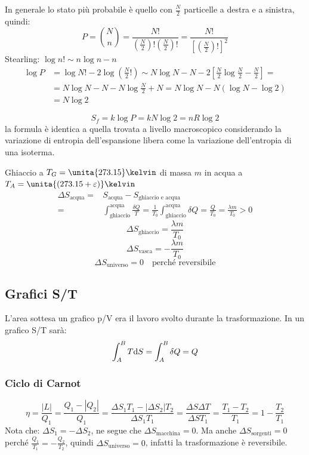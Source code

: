 In generale lo stato più probabile è quello con $\frac{N}{2}$ particelle a destra e a sinistra, quindi:
$$P=\binom{N}{n}=\frac{N!}{\left(\frac{N}{2}\right)!\left(\frac{N}{2}\right)!}=\frac{N!}{\left[\left(\frac{N}{2}\right)!\right]^2}$$
Stearling: $\log n!\sim n\log n-n$
\begin{align*}
\log P&=\log N!-2\log\left(\frac{N}{2}!\right)\sim N\log N-N-2\left[\frac{N}{2}\log\frac{N}{2}-\frac{N}{2}\right]=\\
&=N\log N-N-N\log\frac{N}{2}+N=N\log N-N\left(\log N-\log 2\right)\\
&=N\log 2
\end{align*}

$$S_f=k\log P=kN\log 2=nR\log 2$$
la formula è identica a quella trovata a livello macroscopico considerando la variazione di entropia dell'espansione libera come la variazione dell'entropia di una isoterma.

\begin{Es}
Ghiaccio a $T_G=\unita{273.15}\kelvin$ di massa $m$ in acqua a $T_A=\unita{(273.15+\varepsilon)}\kelvin$
\begin{align*}
\Delta S_\text{acqua}=&S_\text{acqua}-S_\text{ghiaccio e acqua}\\
=&\int_\text{ghiaccio}^\text{acqua}\frac{\delta Q}{T}=\frac{1}{T_0}\int_\text{ghiaccio}^\text{acqua}\delta Q=\frac{Q}{T_0}=\frac{\lambda m}{T_0}>0
\end{align*}
$$\Delta S_\text{ghiaccio}=\frac{\lambda m}{T_0}$$
$$\Delta S_\text{vasca}=-\frac{\lambda m}{T_0}$$
$$\Delta S_\text{universo}=0\quad\text{perché reversibile}$$
\end{Es}
\subsection{Grafici S/T}
L'area sottesa un grafico p/V era il lavoro svolto durante la trasformazione. In un grafico S/T sarà:
$$\int_A^B T\mathrm{d} S=\int_A^B\delta Q=Q$$
\subsubsection{Ciclo di Carnot}
$$\eta=\frac{|L|}{Q_1}=\frac{Q_1-|Q_2|}{Q_1}=\frac{\Delta S_1T_1-|\Delta S_2| T_2}{\Delta S_1 T_1}=\frac{\Delta S\Delta T}{\Delta S T_1}=\frac{T_1-T_2}{T_1}=1-\frac{T_2}{T_1}$$
Nota che: $\Delta S_1=-\Delta S_2$, ne segue che $\Delta S_\text{macchina}=0$. Ma anche \mbox{$\Delta S_\text{sorgenti}=0$} perché $\frac{Q_1}{T_1}=-\frac{Q_2}{T_2}$, quindi $\Delta S_\text{universo}=0$, infatti la trasformazione è reversibile.

